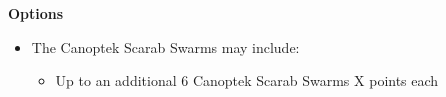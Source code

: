 \begin{minipage}[t]{0.72\textwidth}
	\vspace*{2em}
	\textbf{Options}
	\begin{itemize}
		\item The Canoptek Scarab Swarms may include:
		\begin{itemize}
			\item Up to an additional 6 Canoptek Scarab Swarms \dotfill X points each
		\end{itemize}
	\end{itemize}
\end{minipage}
\hspace{0.5em}


\newpage

